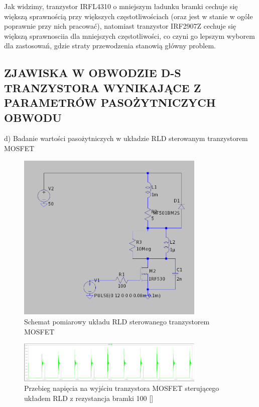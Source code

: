 \documentclass[11pt]{article}
\begin{document}
Jak widzimy, tranzystor IRFL4310 o mniejszym ładunku bramki cechuje się większą sprawnością przy większych częstotliwościach (oraz jest w stanie w ogóle poprawnie przy nich pracować), natomiast tranzystor IRF2907Z
cechuje się większą sprawnosciia dla mniejszych częstotliwości, co czyni go lepszym wyborem dla zastosowań, gdzie
straty przewodzenia stanowią główny problem.\\

\subsection{ZJAWISKA W OBWODZIE D-S TRANZYSTORA WYNIKAJĄCE Z PARAMETRÓW PASOŻYTNICZYCH OBWODU}

d) Badanie wartości pasożytniczych w układzie RLD sterowanym tranzystorem MOSFET

\begin{figure}[H]
\centering
\includegraphics[width=0.8\textwidth]{aun1_rld_without_snubber.png}
\caption{Schemat pomiarowy układu RLD sterowanego tranzystorem MOSFET}
\end{figure}

\begin{figure}[H]
\centering
\includegraphics[width=0.8\textwidth]{aun1_rld_without_snubber_rgate100ohm.png}
\caption{Przebieg napięcia na wyjściu tranzystora MOSFET sterującego układem RLD z rezystancja bramki 100 [\Omega]}
\end{figure}
\end{document}
